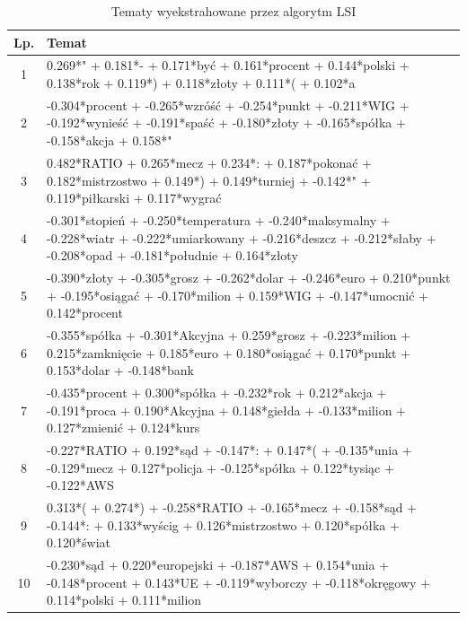 \documentclass[11pt,a4paper]{article}
\begin{document}
\begin{table}[h]
\label{fig:lsi_topics}
\caption{Tematy wyekstrahowane przez algorytm LSI}
\begin{tabular}{|c|p{\linewidth}|}
\hline
Lp. & Temat \\\hline
1 & 0.269*" + 0.181*- + 0.171*być + 0.161*procent + 0.144*polski + 0.138*rok + 0.119*) + 0.118*złoty + 0.111*( + 0.102*a \\\hline
2 & -0.304*procent + -0.265*wzróść + -0.254*punkt + -0.211*WIG + -0.192*wynieść + -0.191*spaść + -0.180*złoty + -0.165*spółka + -0.158*akcja + 0.158*" \\\hline
3 & 0.482*RATIO + 0.265*mecz + 0.234*: + 0.187*pokonać + 0.182*mistrzostwo + 0.149*) + 0.149*turniej + -0.142*" + 0.119*piłkarski + 0.117*wygrać \\\hline
4 & -0.301*stopień + -0.250*temperatura + -0.240*maksymalny + -0.228*wiatr + -0.222*umiarkowany + -0.216*deszcz + -0.212*słaby + -0.208*opad + -0.181*południe + 0.164*złoty \\\hline
5 & -0.390*złoty + -0.305*grosz + -0.262*dolar + -0.246*euro + 0.210*punkt + -0.195*osiągać + -0.170*milion + 0.159*WIG + -0.147*umocnić + 0.142*procent \\\hline
6 & -0.355*spółka + -0.301*Akcyjna + 0.259*grosz + -0.223*milion + 0.215*zamknięcie + 0.185*euro + 0.180*osiągać + 0.170*punkt + 0.153*dolar + -0.148*bank \\\hline
7 & -0.435*procent + 0.300*spółka + -0.232*rok + 0.212*akcja + -0.191*proca + 0.190*Akcyjna + 0.148*giełda + -0.133*milion + 0.127*zmienić + 0.124*kurs \\\hline
8 & -0.227*RATIO + 0.192*sąd + -0.147*: + 0.147*( + -0.135*unia + -0.129*mecz + 0.127*policja + -0.125*spółka + 0.122*tysiąc + -0.122*AWS \\\hline
9 & 0.313*( + 0.274*) + -0.258*RATIO + -0.165*mecz + -0.158*sąd + -0.144*: + 0.133*wyścig + 0.126*mistrzostwo + 0.120*spółka + 0.120*świat \\\hline
10 & -0.230*sąd + 0.220*europejski + -0.187*AWS + 0.154*unia + -0.148*procent + 0.143*UE + -0.119*wyborczy + -0.118*okręgowy + 0.114*polski + 0.111*milion \\\hline
\end{tabular}
\end{table}
\end{document}

